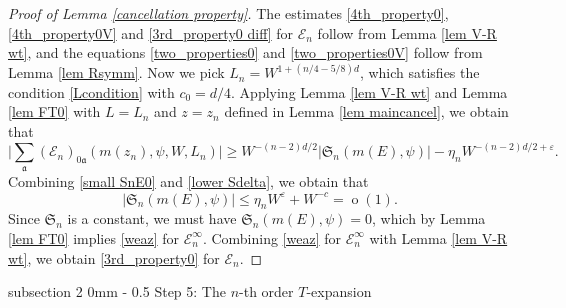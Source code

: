 \documentclass{article}
\makeatletter
\newcommand{\1}{\mathds{1}}
\numberwithin{equation}{section}
\newcommand{\be}{\begin{equation}}
\newcommand{\ee}{\end{equation}}
\newcommand{\e}{{\varepsilon}}
\newcommand{\fa}{{\mathfrak a}}
\renewcommand{\cal}{\mathcal}
\renewcommand{\leq}{\leqslant}
\renewcommand{\geq}{\geqslant}
\renewcommand{\le}{\leq}
\renewcommand{\ge}{\geq}
\DeclareMathOperator{\oo}{o}
\theoremstyle{plain} %
\theoremstyle{remark}
\newcommand{\cob}{\color{purple}}
\newcommand{\Sele}{{\mathcal E}}
\newcommand{\Seleinf}{{\mathcal E}^{\infty}}
\newcommand{\Sint}{\mathfrak S}
\renewcommand{\subsection}{\@startsection
{subsection}%
{2}%
{0mm}%
{-\baselineskip}%
{0.5\baselineskip}%
{\normalfont\bf\itshape}} %
\makeatother
\begin{document}
\begin{proof}[Proof of Lemma \ref{cancellation property}] 
	The estimates \eqref{4th_property0}, \eqref{4th_property0V} and \eqref{3rd_property0 diff} for $\Sele_n$ follow from  Lemma \ref{lem V-R wt}, and the equations \eqref{two_properties0} and \eqref{two_properties0V} follow from Lemma \ref{lem Rsymm}. Now we pick 
	$ L_{n}= W^{1+\left(n/4-5/8\right)d}$,
	which satisfies the condition \eqref{Lcondition} with $c_0=d/4$. Applying Lemma \ref{lem V-R wt} and Lemma \ref{lem FT0} with $L=L_n$ and $z=z_n$ defined in Lemma \ref{lem maincancel}, we obtain that 
	\be\label{lower Sdelta} 
	\Big|\sum_{\fa} (\Sele_n)_{0\fa} (m(z_n),\psi, W, L_n) \Big| \ge W^{-(n-2)d/2}\left|{\Sint}_{n}(m(E), \psi)\right| - \eta_n W^{-(n-2)d/2+\e}.
	\ee
	Combining \eqref{small SnE0} and \eqref{lower Sdelta}, we obtain that 
	$$ \left|{\Sint}_{n}(m(E), \psi)\right| \le \eta_n W^{\e} + W^{-c} =\oo(1).$$
	Since ${\Sint}_{n}$ is a constant, we must have ${\Sint}_{n}(m(E), \psi)=0$, which by Lemma \ref{lem FT0} implies \eqref{weaz} for $\Seleinf_n $.  Combining \eqref{weaz} for $\Seleinf_n $ with Lemma \ref{lem V-R wt}, we obtain \eqref{3rd_property0} for $\Sele_n $.
\end{proof}

%
% 
% 
% 

\subsection{Step 5: The $n$-th order $T$-expansion}\label{sec expT}
\end{document}
